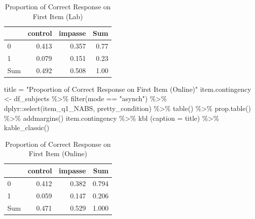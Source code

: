 \documentclass[
  letterpaper,
  DIV=11,
  numbers=noendperiod]{scrreprt}
\newenvironment{Shaded}{\begin{snugshade}}{\end{snugshade}}
\newcommand{\AttributeTok}[1]{\textcolor[rgb]{0.40,0.45,0.13}{#1}}
\newcommand{\FunctionTok}[1]{\textcolor[rgb]{0.28,0.35,0.67}{#1}}
\newcommand{\NormalTok}[1]{\textcolor[rgb]{0.00,0.23,0.31}{#1}}
\newcommand{\OtherTok}[1]{\textcolor[rgb]{0.00,0.23,0.31}{#1}}
\newcommand{\SpecialCharTok}[1]{\textcolor[rgb]{0.37,0.37,0.37}{#1}}
\newcommand{\StringTok}[1]{\textcolor[rgb]{0.13,0.47,0.30}{#1}}
\begin{document}
\begin{table}

\caption{Proportion of Correct Response on First Item (Lab)}
\centering
\begin{tabular}[t]{l|r|r|r}
\hline
  & control & impasse & Sum\\
\hline
0 & 0.413 & 0.357 & 0.77\\
\hline
1 & 0.079 & 0.151 & 0.23\\
\hline
Sum & 0.492 & 0.508 & 1.00\\
\hline
\end{tabular}
\end{table}

\begin{Shaded}
\begin{Highlighting}[]
\NormalTok{title }\OtherTok{=} \StringTok{"Proportion of Correct Response on First Item (Online)"}
\NormalTok{item.contingency }\OtherTok{\textless{}{-}}\NormalTok{ df\_subjects }\SpecialCharTok{\%\textgreater{}\%} \FunctionTok{filter}\NormalTok{(mode }\SpecialCharTok{==} \StringTok{"asynch"}\NormalTok{) }\SpecialCharTok{\%\textgreater{}\%}\NormalTok{ dplyr}\SpecialCharTok{::}\FunctionTok{select}\NormalTok{(item\_q1\_NABS, pretty\_condition) }\SpecialCharTok{\%\textgreater{}\%} \FunctionTok{table}\NormalTok{() }\SpecialCharTok{\%\textgreater{}\%} \FunctionTok{prop.table}\NormalTok{() }\SpecialCharTok{\%\textgreater{}\%} \FunctionTok{addmargins}\NormalTok{()}
\NormalTok{item.contingency }\SpecialCharTok{\%\textgreater{}\%} \FunctionTok{kbl}\NormalTok{ (}\AttributeTok{caption =}\NormalTok{ title) }\SpecialCharTok{\%\textgreater{}\%} \FunctionTok{kable\_classic}\NormalTok{()}
\end{Highlighting}
\end{Shaded}

\begin{table}

\caption{Proportion of Correct Response on First Item (Online)}
\centering
\begin{tabular}[t]{l|r|r|r}
\hline
  & control & impasse & Sum\\
\hline
0 & 0.412 & 0.382 & 0.794\\
\hline
1 & 0.059 & 0.147 & 0.206\\
\hline
Sum & 0.471 & 0.529 & 1.000\\
\hline
\end{tabular}
\end{table}
\end{document}
